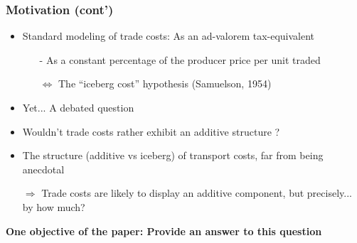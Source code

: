 \documentclass[10 pt,Helvetica, french]{beamer}
\begin{document}
\begin{frame}
\frametitle{Motivation (cont')}
\begin{itemize}
\item Standard modeling of trade costs: As an ad-valorem tax-equivalent \vspace{0.1cm}
\begin{itemize}
\item[-] As a constant percentage of the producer price per unit traded \vspace{0.1cm}
\item[$\Leftrightarrow$] The ``iceberg cost'' hypothesis (Samuelson, 1954) \vspace{0.1cm}
\end{itemize}
\item Yet... A debated question \vspace{0.1cm}
\item Wouldn't trade costs rather exhibit an additive structure ?  \vspace{0.1cm}
\item The structure (additive vs iceberg) of transport costs, far from being anecdotal \vspace{0.1cm}
\item[$\Rightarrow$] Trade costs are likely to display an additive component, but precisely... by how much? \vspace{0.1cm}
\end{itemize}
\textbf{One objective of the paper: Provide an answer to this question}
\end{frame}
\end{document}
